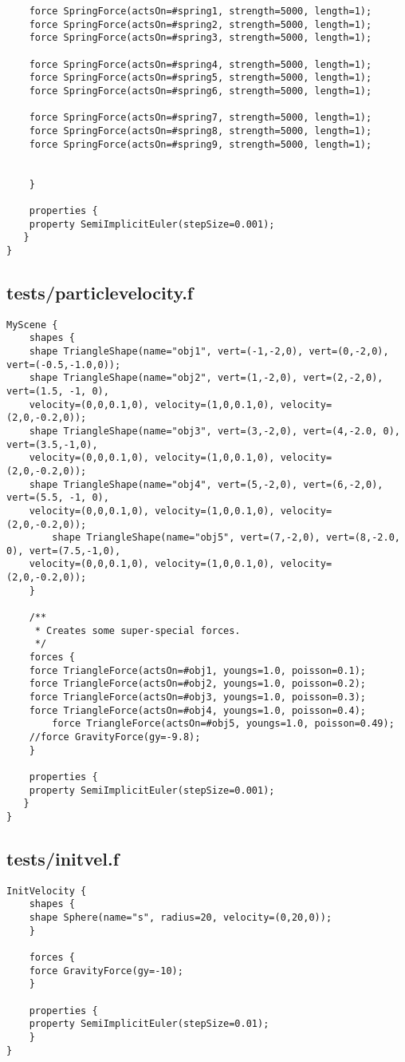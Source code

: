\begin{lstlisting}
	force SpringForce(actsOn=#spring1, strength=5000, length=1);
	force SpringForce(actsOn=#spring2, strength=5000, length=1);
	force SpringForce(actsOn=#spring3, strength=5000, length=1);

	force SpringForce(actsOn=#spring4, strength=5000, length=1);
	force SpringForce(actsOn=#spring5, strength=5000, length=1);
	force SpringForce(actsOn=#spring6, strength=5000, length=1);

	force SpringForce(actsOn=#spring7, strength=5000, length=1);
	force SpringForce(actsOn=#spring8, strength=5000, length=1);
	force SpringForce(actsOn=#spring9, strength=5000, length=1);


    }

    properties { 
	property SemiImplicitEuler(stepSize=0.001);
   }
}
\end{lstlisting}

\subsection*{tests/particlevelocity.f}
\begin{lstlisting}
MyScene {
    shapes {
	shape TriangleShape(name="obj1", vert=(-1,-2,0), vert=(0,-2,0), vert=(-0.5,-1.0,0));
	shape TriangleShape(name="obj2", vert=(1,-2,0), vert=(2,-2,0), vert=(1.5, -1, 0), 
	velocity=(0,0,0.1,0), velocity=(1,0,0.1,0), velocity=(2,0,-0.2,0));
	shape TriangleShape(name="obj3", vert=(3,-2,0), vert=(4,-2.0, 0), vert=(3.5,-1,0),
	velocity=(0,0,0.1,0), velocity=(1,0,0.1,0), velocity=(2,0,-0.2,0));
	shape TriangleShape(name="obj4", vert=(5,-2,0), vert=(6,-2,0), vert=(5.5, -1, 0),
	velocity=(0,0,0.1,0), velocity=(1,0,0.1,0), velocity=(2,0,-0.2,0));
        shape TriangleShape(name="obj5", vert=(7,-2,0), vert=(8,-2.0, 0), vert=(7.5,-1,0),
	velocity=(0,0,0.1,0), velocity=(1,0,0.1,0), velocity=(2,0,-0.2,0));
	}

    /**
     * Creates some super-special forces.
     */
    forces {
	force TriangleForce(actsOn=#obj1, youngs=1.0, poisson=0.1);
	force TriangleForce(actsOn=#obj2, youngs=1.0, poisson=0.2);
	force TriangleForce(actsOn=#obj3, youngs=1.0, poisson=0.3);
	force TriangleForce(actsOn=#obj4, youngs=1.0, poisson=0.4);
        force TriangleForce(actsOn=#obj5, youngs=1.0, poisson=0.49);
	//force GravityForce(gy=-9.8);
    }

    properties { 
	property SemiImplicitEuler(stepSize=0.001);
   }
}
\end{lstlisting}

\subsection*{tests/initvel.f}
\begin{lstlisting}
InitVelocity {
    shapes {
	shape Sphere(name="s", radius=20, velocity=(0,20,0));
    }

    forces {
	force GravityForce(gy=-10);
    }

    properties {
	property SemiImplicitEuler(stepSize=0.01);
    }
}\end{lstlisting}

